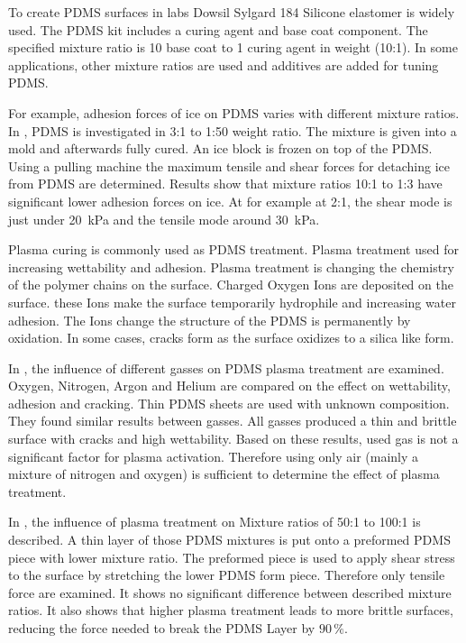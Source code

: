 To create PDMS surfaces in labs Dowsil Sylgard 184 Silicone elastomer is widely used\cite{DOW.}. The PDMS kit includes a curing agent and base coat component. The specified mixture ratio is 10 base coat to 1 curing agent in weight (10:1). In some applications, other mixture ratios are used and additives are added for tuning PDMS.

For example, adhesion forces of ice on PDMS varies with different mixture ratios. In \cite{IbanezIbanez.2022}, PDMS is investigated in 3:1 to 1:50 weight ratio. The mixture is given into a mold and afterwards fully cured. An ice block is frozen on top of the PDMS. Using a pulling machine the maximum tensile and shear forces for detaching ice from PDMS are determined. Results show that mixture ratios 10:1 to 1:3 have significant lower adhesion forces on ice. At for example at 2:1, the shear mode is just under \SI{20}{\kilo\pascal} and the tensile mode around \SI{30}{\kilo\pascal}. 

Plasma curing is commonly used as PDMS treatment. Plasma treatment used for increasing wettability and adhesion. Plasma treatment is changing the chemistry of the polymer chains on the surface. Charged Oxygen Ions are deposited on the surface. these Ions make the surface temporarily hydrophile and increasing water adhesion. The Ions change the structure of the PDMS is permanently by oxidation. In some cases, cracks form as the surface oxidizes to a silica like form.

In \cite{Owen.1994}, the influence of different gasses on PDMS plasma treatment are examined. Oxygen, Nitrogen, Argon and Helium are compared on the effect on wettability, adhesion and cracking. Thin PDMS sheets are used with unknown composition. They found similar results between gasses. All gasses produced a thin and brittle surface with cracks and high wettability. Based on these results, used gas is not a significant factor for plasma activation. Therefore using only air (mainly a mixture of nitrogen and oxygen) is sufficient to determine the effect of plasma treatment.

In \cite{Ohishi.2017}, the influence of plasma treatment on Mixture ratios of 50:1 to 100:1 is described. A thin layer of those PDMS mixtures is put onto a preformed PDMS piece with lower mixture ratio. The preformed piece is used to apply shear stress to the surface by stretching the lower PDMS form piece. Therefore only tensile force are examined. It shows no significant difference between described mixture ratios. It also shows that higher plasma treatment leads to more brittle surfaces, reducing the force needed to break the PDMS Layer by $90\,\%$.

